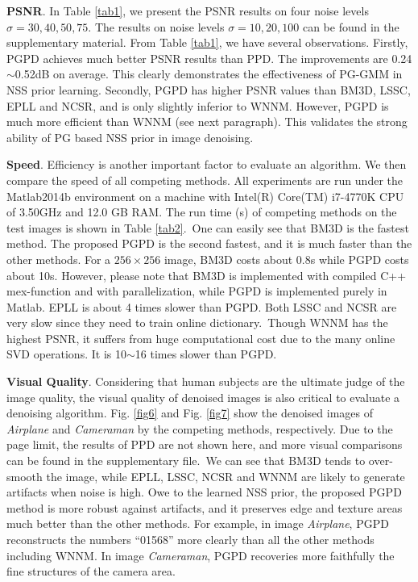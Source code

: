 \textbf{PSNR}. In Table \ref{tab1}, we present the PSNR results on four noise levels $\sigma=30,40,50,75$. The results on noise levels $\sigma=10,20,100$ can be found in the supplementary material. From Table \ref{tab1}, we have several observations. Firstly, PGPD achieves much better PSNR results than PPD. The improvements are 0.24$\sim$0.52dB on average. This clearly demonstrates the effectiveness of PG-GMM in NSS prior learning. Secondly, PGPD has higher PSNR values than BM3D, LSSC, EPLL and NCSR, and is only slightly inferior to WNNM. However, PGPD is much more efficient than WNNM (see next paragraph). This validates the strong ability of PG based NSS prior in image denoising. 

\textbf{Speed}. Efficiency is another important factor to evaluate an algorithm. We then compare the speed of all competing methods. All experiments are run under the Matlab2014b environment on a machine with Intel(R) Core(TM) i7-4770K CPU of 3.50GHz and 12.0 GB RAM. The run time (s) of competing methods on the test images is shown in Table \ref{tab2}.\ One can easily see that BM3D is the fastest method. The proposed PGPD is the second fastest, and it is much faster than the other methods. For a $256\times256$ image, BM3D costs about 0.8s while PGPD costs about 10s. However, please note that BM3D is implemented with compiled C++ mex-function and with parallelization, while PGPD is implemented purely in Matlab. EPLL is about 4 times slower than PGPD. Both LSSC and NCSR are very slow since they need to train online dictionary.\ Though WNNM has the highest PSNR, it suffers from huge computational cost due to the many online SVD operations. It is 10$\sim$16 times slower than PGPD. 

\textbf{Visual Quality}. Considering that human subjects are the ultimate judge of the image quality, the visual quality of denoised images is also critical to evaluate a denoising algorithm. Fig. \ref{fig6} and Fig. \ref{fig7} show the denoised images of \textsl{Airplane} and \textsl{Cameraman} by the competing methods, respectively. Due to the page limit, the results of PPD are not shown here, and more visual comparisons can be found in the supplementary file.\ We can see that BM3D tends to over-smooth the image, while EPLL, LSSC, NCSR and WNNM are likely to generate artifacts when noise is high. Owe to the learned NSS prior, the proposed PGPD method is more robust against artifacts, and it preserves edge and texture areas much better than the other methods. For example, in image \textsl{Airplane}, PGPD reconstructs the numbers ``01568'' more clearly than all the other methods including WNNM. In image \textsl{Cameraman}, PGPD recoveries more faithfully the fine structures of the camera area. 

